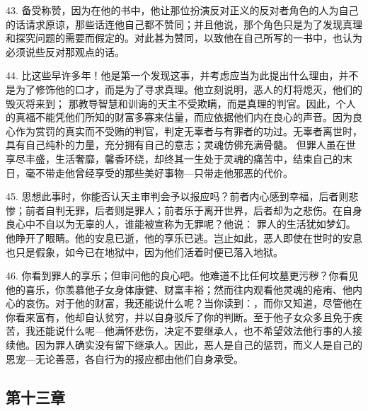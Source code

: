 43. 备受称赞，因为在他的书中，他让那位扮演反对正义的反对者角色的人为自己的话请求原谅，那些话连他自己都不赞同；并且他说，那个角色只是为了发现真理和探究问题的需要而假定的。对此甚为赞同，以致他在自己所写的一书中，也认为必须说些反对那观点的话。\par

44. 比这些早许多年！他是第一个发现这事，并考虑应当为此提出什么理由，并不是为了修饰他的口才，而是为了寻求真理。他立刻说明，恶人的灯将熄灭，他们的毁灭将来到； 那教导智慧和训诲的天主不受欺瞒，而是真理的判官。因此，个人的真福不能凭他们所知的财富多寡来估量，而应依据他们内在良心的声音。因为良心作为赏罚的真实而不受贿的判官，判定无辜者与有罪者的功过。无辜者离世时，具有自己纯朴的力量，充分拥有自己的意志；灵魂仿佛充满骨髓。 但罪人虽在世享尽丰盛，生活奢靡，馨香环绕，却终其一生处于灵魂的痛苦中，结束自己的末日，毫不带走他曾经享受的那些美好事物---只带走他邪恶的代价。\par

45. 思想此事时，你能否认天主审判会予以报应吗？前者内心感到幸福，后者则悲惨；前者自判无罪，后者则是罪人；前者乐于离开世界，后者却为之悲伤。在自身良心中不自以为无辜的人，谁能被宣称为无罪呢？他说： 罪人的生活犹如梦幻。他睁开了眼睛。他的安息已逝，他的享乐已逃。岂止如此，恶人即使在世时的安息也只是假象，如今已在地狱中，因为他们活着时便已落入地狱。\par

46. 你看到罪人的享乐；但审问他的良心吧。他难道不比任何坟墓更污秽？你看见他的喜乐，你羡慕他子女身体康健、财富丰裕；然而往内观看他灵魂的疮痏、他内心的哀伤。对于他的财富，我还能说什么呢？当你读到：，而你又知道，尽管他在你看来富有，他却自认贫穷，并以自身驳斥了你的判断。至于他子女众多且免于疾苦，我还能说什么呢---他满怀悲伤，决定不要继承人，也不希望效法他行事的人接续他。因为罪人确实没有留下继承人。因此，恶人是自己的惩罚，而义人是自己的恩宠---无论善恶，各自行为的报应都由他们自身承受。\par


\subsection{第十三章}

\par

